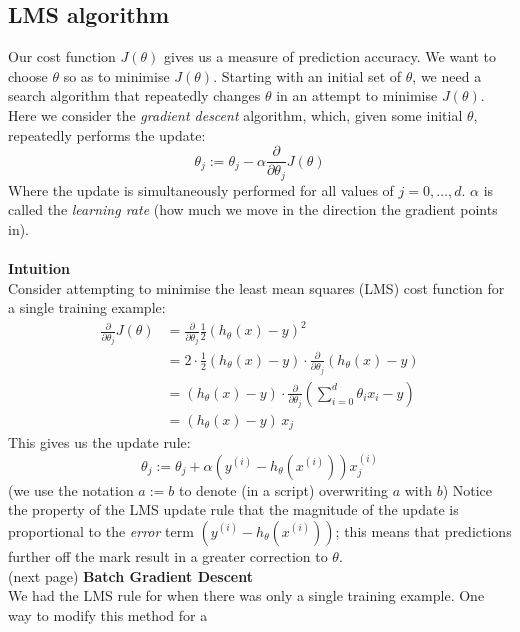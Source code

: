 \documentclass{report}
\begin{document}
\subsection{LMS algorithm}
Our cost function $J(\theta)$ gives us a measure of prediction accuracy. We want to choose $\theta$ so as to
minimise $J(\theta)$. Starting with an initial set of $\theta$, we need a search algorithm that
repeatedly changes $\theta$ in an attempt to minimise $J(\theta)$. Here we consider the \textit{gradient descent}
algorithm, which, given some initial $\theta$, repeatedly performs the update:
\begin{equation*}
\theta_j:=\theta_j-\alpha\frac{\partial}{\partial\theta_j}J(\theta)
\end{equation*}
Where the update is simultaneously performed for all values of $j=0,\ldots,d$. $\alpha$ is called the 
\textit{learning rate}
(how much we move in the direction the gradient points in).\\
\vspace{1mm}\\
\textbf{Intuition}\\
Consider attempting to minimise the least mean squares (LMS) cost function for a single training example:
\begin{align*}
\frac{\partial}{\partial\theta_j}J(\theta)&=\frac{\partial}{\partial\theta_j}\frac{1}{2}(h_\theta(x)-y)^2\\
&=2\cdot\frac{1}{2}(h_\theta(x)-y)\cdot\frac{\partial}{\partial\theta_j}(h_\theta(x)-y)\\
&=(h_\theta(x)-y)\cdot\frac{\partial}{\partial\theta_j}\left(\sum^d_{i=0}\theta_ix_i-y\right)\\
&=(h_\theta(x)-y)\,x_j
\end{align*}
This gives us the update rule:
\begin{equation*}
\theta_j:=\theta_j+\alpha\left(y^{(i)}-h_\theta(x^{(i)})\right)x_j^{(i)}
\end{equation*}
(we use the notation $a:=b$ to denote (in a script) overwriting $a$ with $b$) Notice the property of the LMS update
rule that the magnitude of the update is proportional to the \textit{error} term 
$\left(y^{(i)}-h_\theta(x^{(i)})\right)$; this means that predictions further off the mark result in a greater
correction to $\theta$.\\
(next page)
\newpage
\noindent\textbf{Batch Gradient Descent}\\
We had the LMS rule for when there was only a single training example. One way to modify this method for a
\end{document}
